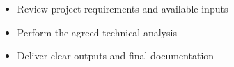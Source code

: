 \begin{itemize}[leftmargin=1.5em]
    \item Review project requirements and available inputs
    \item Perform the agreed technical analysis
    \item Deliver clear outputs and final documentation
\end{itemize}